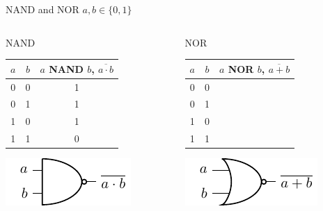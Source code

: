 \documentclass[presentation,aspectratio=1610]{beamer}
\begin{document}
\begin{frame}[label={sec:org1573679}]{NAND and NOR}
\(a, b \in \{0,1\}\)
\begin{columns}
\begin{column}{0.5\columnwidth}
\begin{block}{NAND}
\begin{center}
\begin{tabular}{|cc|c|}
\(a\) & \(b\) & \(a\) NAND \(b\), \(\overline{a\cdot{}b}\)\\
\hline
0 & 0 & 1\\
0 & 1 & 1\\
1 & 0 & 1\\
1 & 1 & 0\\
\hline
\end{tabular}
\end{center}

\begin{center}
\includegraphics[width=0.5\linewidth]{../../figures/nand-gate.pdf}
\end{center}
\end{block}
\end{column}

\begin{column}{0.5\columnwidth}
\begin{block}{NOR}
\begin{center}
\begin{tabular}{|cc|c|}
\(a\) & \(b\) & \(a\) NOR \(b\), \(\overline{a+b}\)\\
\hline
0 & 0 & \\
0 & 1 & \\
1 & 0 & \\
1 & 1 & \\
\hline
\end{tabular}
\end{center}

\begin{center}
\includegraphics[width=0.5\linewidth]{../../figures/nor-gate.pdf}
\end{center}
\end{block}
\end{column}
\end{columns}
\end{frame}
\end{document}
